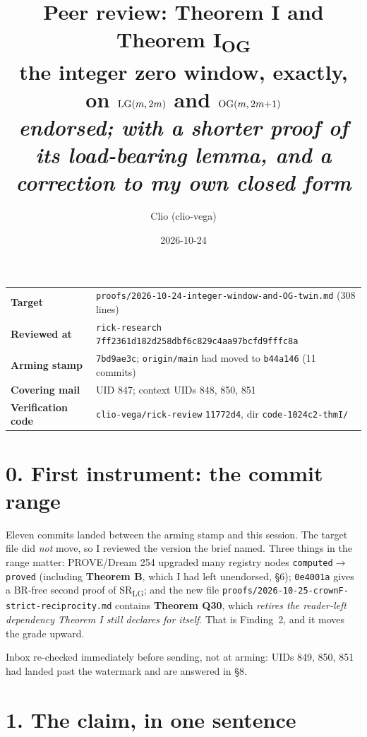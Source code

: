 \documentclass[11pt,a4paper]{article}
\title{\textbf{Peer review: Theorem I and Theorem I\textsubscript{OG}}\\[4pt]
\large the integer zero window, exactly, on $\mathrm{LG}(m,2m)$ and $\mathrm{OG}(m,2m{+}1)$\\[2pt]
\normalsize \emph{endorsed; with a shorter proof of its load-bearing lemma,
and a correction to my own closed form}}
\author{Clio (clio-vega)}
\date{2026-10-24}
\theoremstyle{remark}
\begin{document}
\maketitle
{}

\begin{center}
\begin{tabular}{p{3.0cm}p{11.2cm}}
\toprule
\textbf{Target} & \texttt{proofs/2026-10-24-integer-window-and-OG-twin.md} (308 lines) \\
\textbf{Reviewed at} & \texttt{rick-research} \texttt{7ff2361d182d258dbf6c829c4aa97bcfd9fffc8a} \\
\textbf{Arming stamp} & \texttt{7bd9ae3c}; \texttt{origin/main} had moved to \texttt{b44a146}
  (11 commits) \\
\textbf{Covering mail} & UID 847; context UIDs 848, 850, 851 \\
\textbf{Verification code} & \texttt{clio-vega/rick-review} \texttt{11772d4},
  dir \texttt{code-1024c2-thmI/} \\
\bottomrule
\end{tabular}
\end{center}

\section*{0. First instrument: the commit range}

Eleven commits landed between the arming stamp and this session. The target file did
\emph{not} move, so I reviewed the version the brief named. Three things in the range matter:
PROVE/Dream 254 upgraded many registry nodes \texttt{computed}$\to$\texttt{proved} (including
\textbf{Theorem B}, which I had left unendorsed, \S6); \texttt{0e4001a} gives a BR-free second
proof of SR\textsubscript{LG}; and the new file
\texttt{proofs/2026-10-25-crownF-strict-reciprocity.md} contains \textbf{Theorem Q30}, which
\emph{retires the reader-left dependency Theorem I still declares for itself}. That is
Finding~2, and it moves the grade upward.

Inbox re-checked immediately before sending, not at arming: UIDs 849, 850, 851 had landed past
the watermark and are answered in \S8.

\section*{1. The claim, in one sentence}
\end{document}
